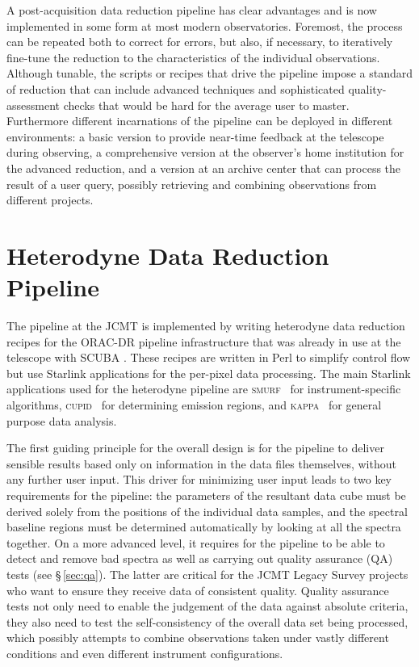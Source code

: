 \documentclass[useAMS,usenatbib]{mn2e}
\newcommand{\KAPPA}{\textsc{kappa}}
\newcommand{\cupid}{\textsc{cupid}}
\newcommand{\smurf}{\textsc{smurf}}
\newcommand{\ascl}[1]{\href{http://www.ascl.net/#1}{ascl:#1}}
\begin{document}
A post-acquisition data reduction pipeline has clear advantages and is
now implemented in some form at most modern observatories. Foremost,
the process can be repeated both to correct for errors, but also, if
necessary, to iteratively fine-tune the reduction to the
characteristics of the individual observations. Although tunable, the
scripts or recipes that drive the pipeline impose a standard of
reduction that can include advanced techniques and sophisticated
quality-assessment checks that would be hard for the average user to
master. Furthermore different incarnations of the pipeline can be
deployed in different environments: a basic version to provide
near-time feedback at the telescope during observing, a comprehensive
version at the observer's home institution for the advanced reduction,
and a version at an archive center that can process the result of a
user query, possibly retrieving and combining observations from
different projects.


\section{Heterodyne Data Reduction Pipeline}

The pipeline at the JCMT is implemented by writing heterodyne data
reduction recipes for the ORAC-DR pipeline infrastructure
\citep[][\ascl{1310.001}]{2011tfa..confE..42J,2015A&C.....9...40J}
that was already in use at the telescope with SCUBA
\citep[e.g.,][]{1999ASPC..172..171J}. These recipes are written in
Perl to simplify control flow but use Starlink applications \citep[see
e.g.,][]{2014ASPC..485..391C} for the per-pixel data processing. The
main Starlink applications used for the heterodyne pipeline are
\smurf\ \citep[][\ascl{1310.007}]{SUN258} for instrument-specific
algorithms, \cupid\ \citep[][\ascl{1311.007}]{2007ASPC..376..425B} for
determining emission regions, and \KAPPA\
\citep[][\ascl{1403.022}]{SUN95} for general
purpose data analysis.

The first guiding principle for the overall
design is for the pipeline to deliver sensible results based only on
information in the data files themselves, without any further user
input. This driver for minimizing user input leads to two key requirements
for the pipeline: the parameters of the resultant data cube must be
derived solely from the positions of the individual data samples, and
the spectral baseline regions must be determined automatically by
looking at all the spectra together.
On a more advanced level, it requires for the pipeline to be
able to detect and remove bad spectra as well as carrying out quality
assurance (QA) tests (see \S\,\ref{sec:qa}). The latter are critical
for the JCMT Legacy Survey projects
\citep{2007PASP..119..855W,2009ApJ...693.1736W,2007PASP..119..102P}
who want to ensure they receive data of consistent quality.  Quality
assurance tests not only need to enable the judgement of the data against absolute
criteria, they also need to test the self-consistency of the overall
data set being processed, which possibly attempts to combine
observations taken under vastly different conditions and even
different instrument configurations.
\end{document}
